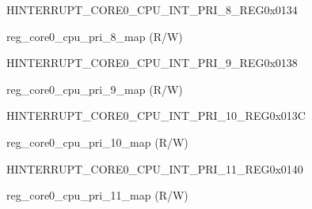 \begin{register}{H}{INTERRUPT\_CORE0\_CPU\_INT\_PRI\_8\_REG}{0x0134}\label{regdesc:INTERRUPTCORE0CPUINTPRI8REG}
%
%
\regnewline%
\begin{regdesc}\begin{reglist}
\label{fielddesc:INTERRUPTCORE0CPUPRI8MAP}\item [INTERRUPT\_CORE0\_CPU\_PRI\_8\_MAP] reg\_core0\_cpu\_pri\_8\_map (R/W)
\end{reglist}\end{regdesc}
\end{register}


\begin{register}{H}{INTERRUPT\_CORE0\_CPU\_INT\_PRI\_9\_REG}{0x0138}\label{regdesc:INTERRUPTCORE0CPUINTPRI9REG}
%
%
\regnewline%
\begin{regdesc}\begin{reglist}
\label{fielddesc:INTERRUPTCORE0CPUPRI9MAP}\item [INTERRUPT\_CORE0\_CPU\_PRI\_9\_MAP] reg\_core0\_cpu\_pri\_9\_map (R/W)
\end{reglist}\end{regdesc}
\end{register}


\begin{register}{H}{INTERRUPT\_CORE0\_CPU\_INT\_PRI\_10\_REG}{0x013C}\label{regdesc:INTERRUPTCORE0CPUINTPRI10REG}
%
%
\regnewline%
\begin{regdesc}\begin{reglist}
\label{fielddesc:INTERRUPTCORE0CPUPRI10MAP}\item [INTERRUPT\_CORE0\_CPU\_PRI\_10\_MAP] reg\_core0\_cpu\_pri\_10\_map (R/W)
\end{reglist}\end{regdesc}
\end{register}


\begin{register}{H}{INTERRUPT\_CORE0\_CPU\_INT\_PRI\_11\_REG}{0x0140}\label{regdesc:INTERRUPTCORE0CPUINTPRI11REG}
%
%
\regnewline%
\begin{regdesc}\begin{reglist}
\label{fielddesc:INTERRUPTCORE0CPUPRI11MAP}\item [INTERRUPT\_CORE0\_CPU\_PRI\_11\_MAP] reg\_core0\_cpu\_pri\_11\_map (R/W)
\end{reglist}\end{regdesc}
\end{register}


